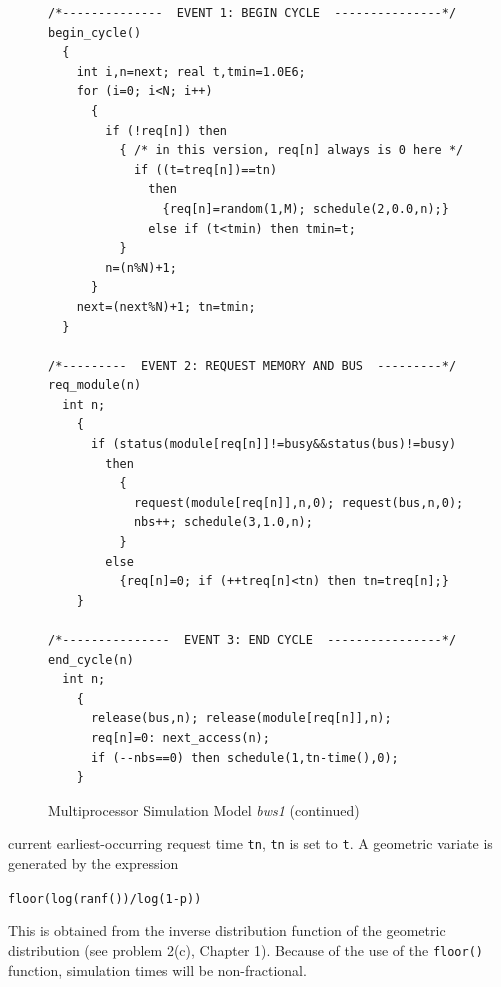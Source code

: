 \begin{figure}[H]
\centering
\begin{minipage}{.98\textwidth}
\begin{lstlisting}[basicstyle=\ttfamily\scriptsize]
/*--------------  EVENT 1: BEGIN CYCLE  ---------------*/
begin_cycle()
  {
    int i,n=next; real t,tmin=1.0E6;
    for (i=0; i<N; i++)
      {
        if (!req[n]) then
          { /* in this version, req[n] always is 0 here */
            if ((t=treq[n])==tn)
              then
                {req[n]=random(1,M); schedule(2,0.0,n);}
              else if (t<tmin) then tmin=t;
          }
        n=(n%N)+1;
      }
    next=(next%N)+1; tn=tmin;
  }

/*---------  EVENT 2: REQUEST MEMORY AND BUS  ---------*/
req_module(n)
  int n;
    {
      if (status(module[req[n]]!=busy&&status(bus)!=busy)
        then
          {
            request(module[req[n]],n,0); request(bus,n,0);
            nbs++; schedule(3,1.0,n);
          }
        else
          {req[n]=0; if (++treq[n]<tn) then tn=treq[n];}
    }

/*---------------  EVENT 3: END CYCLE  ----------------*/
end_cycle(n)
  int n;
    {
      release(bus,n); release(module[req[n]],n);
      req[n]=0: next_access(n);
      if (--nbs==0) then schedule(1,tn-time(),0);
    }
\end{lstlisting}
\end{minipage}
\caption{Multiprocessor Simulation Model \emph{bws1} (continued)}
\end{figure}
\noindent current earliest-occurring request time \texttt{tn}, \texttt{tn} is set to \texttt{t}. A geometric variate
is generated by the expression
\begin{center}
\texttt{floor(log(ranf())/log(1-p))}
\end{center}
This is obtained from the inverse distribution function of the geometric
distribution (see problem 2(c), Chapter 1). Because of the use of the \texttt{floor()}
function, simulation times will be non-fractional.





